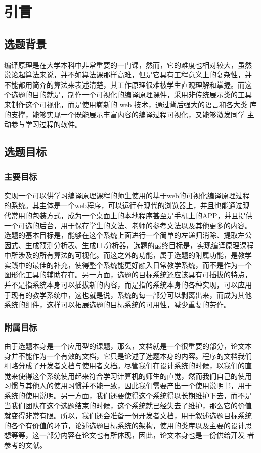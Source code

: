 \section{引言}
\subsection{选题背景}
编译原理是在大学本科中非常重要的一门课，然而，它的难度也相对较大，虽然
说论起算法来说，并不如算法课那样高难，但是它具有工程意义上的复杂性，并
不能都用简介的算法来表述清楚，其工作原理很难被学生直观理解和掌握。而这
个选题的目的就是，制作一个可视化的编译原理课件，采用非传统展示类的工具
来制作这个可视化，而是使用崭新的 web 技术，通过背后强大的语言和各大类
库的支撑，能够实现一个既能展示丰富内容的编译过程可视化，又能够激发同学
主动参与学习过程的软件。
\subsection{选题目标}
\subsubsection{主要目标}
实现一个可以供学习编译原理课程的师生使用的基于web的可视化编译原理过程
的系统。其主体是一个web程序，可以运行在现代的浏览器上，并且也能通过现
代常用的包装方式，成为一个桌面上的本地程序甚至是手机上的APP，并且提供
一个可选的后台，用于保存学生的文法、老师的参考文法以及其他更多的内容。
选题的基本目标是，能够在这个系统上面进行一个简单的左递归消除、提取左公
因式、生成预测分析表、生成LL分析器，选题的最终目标是，实现编译原理课程
中所涉及的所有算法的可视化。而这之外的功能，属于选题的附属功能，是教学
实践中的最佳的补充，使得整个系统能更好融入日常教学系统，而不是作为一个
图形化工具的辅助存在。另一方面，选题的目标系统还应该具有可插拔的特点，
并不是指系统本身可以插拔新的内容，而是指的系统本身的各种实现，可以应用
于现有的教学系统中，这也就是说，系统的每一部分可以剥离出来，而成为其他
系统的组件，这样可以拓展选题的目标系统的可用性，减少重复的劳作。
\subsubsection{附属目标}
由于选题本身是一个应用型的课题，那么，文档就是一个很重要的部分，论文本
身并不能作为一个有效的文档，它只是论述了选题本身的内容。程序的文档我们
粗略分成了开发者文档与使用者文档。尽管我们在设计系统的时候，以我们的直
觉来使得这个系统使用起来符合学习计算机的师生的直觉，然而我们自己的使用
习惯与其他人的使用习惯并不能一致，因此我们需要产出一个使用说明书，用于
系统的使用说明。另一方面，我们还要使得这个系统得以长期维护下去，而不是
当我们团队在这个选题结束的时候，这个系统就已经失去了维护，那么它的价值
就变得非常有限。所以，我们还会准备一份开发者文档，用于叙述选题目标系统
的各个有价值的环节，论述选题目标系统的架构，使用的类库以及主要的设计思
想等等，这一部分内容在论文也有所体现，因此，论文本身也是一份供给开发
者参考的文献。
